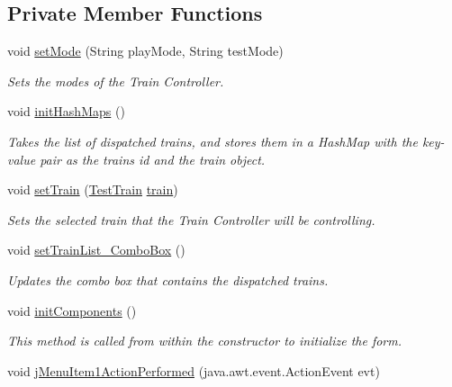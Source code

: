 \subsection*{Private Member Functions}
\begin{DoxyCompactItemize}
\item 
void \hyperlink{classTrainControllerComps_1_1TrainController_a5f7d0db2d1b3da0c43a85bc0ca38f9a4}{set\+Mode} (String play\+Mode, String test\+Mode)
\begin{DoxyCompactList}\small\item\em Sets the modes of the Train Controller. \end{DoxyCompactList}\item 
void \hyperlink{classTrainControllerComps_1_1TrainController_ab44cad6ee65d5a8536ae1df5a34cd58a}{init\+Hash\+Maps} ()
\begin{DoxyCompactList}\small\item\em Takes the list of dispatched trains, and stores them in a Hash\+Map with the key-\/value pair as the train\textquotesingle{}s id and the train object. \end{DoxyCompactList}\item 
void \hyperlink{classTrainControllerComps_1_1TrainController_a3866dec9cadf09228d1fc1173f824035}{set\+Train} (\hyperlink{classTrainControllerComps_1_1TestTrain}{Test\+Train} \hyperlink{classtrain}{train})
\begin{DoxyCompactList}\small\item\em Sets the selected train that the Train Controller will be controlling. \end{DoxyCompactList}\item 
void \hyperlink{classTrainControllerComps_1_1TrainController_af0888d1788e5b00933e77de1809b157b}{set\+Train\+List\+\_\+\+Combo\+Box} ()
\begin{DoxyCompactList}\small\item\em Updates the combo box that contains the dispatched trains. \end{DoxyCompactList}\item 
void \hyperlink{classTrainControllerComps_1_1TrainController_a32ab56235b79bdc3abeacc716c582a7e}{init\+Components} ()
\begin{DoxyCompactList}\small\item\em This method is called from within the constructor to initialize the form. \end{DoxyCompactList}\item 
void \hyperlink{classTrainControllerComps_1_1TrainController_adc8b31c6a0be0f6e41870ef47d53eea6}{j\+Menu\+Item1\+Action\+Performed} (java.\+awt.\+event.\+Action\+Event evt)

\end{DoxyCompactItemize}
